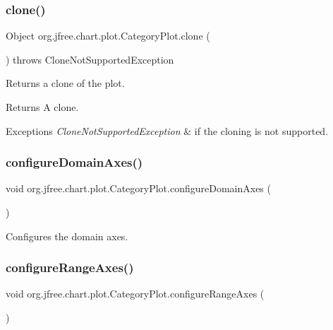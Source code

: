 \subsubsection{\texorpdfstring{clone()}{clone()}}
{\footnotesize\ttfamily Object org.\+jfree.\+chart.\+plot.\+Category\+Plot.\+clone (\begin{DoxyParamCaption}{ }\end{DoxyParamCaption}) throws Clone\+Not\+Supported\+Exception}

Returns a clone of the plot.

\begin{DoxyReturn}{Returns}
A clone.
\end{DoxyReturn}

\begin{DoxyExceptions}{Exceptions}
{\em Clone\+Not\+Supported\+Exception} & if the cloning is not supported. \\
\hline
\end{DoxyExceptions}
\mbox{\label{classorg_1_1jfree_1_1chart_1_1plot_1_1_category_plot_aecdb1a8c70518fdf1402ef3ebdcd1fe3}} 
\subsubsection{\texorpdfstring{configure\+Domain\+Axes()}{configureDomainAxes()}}
{\footnotesize\ttfamily void org.\+jfree.\+chart.\+plot.\+Category\+Plot.\+configure\+Domain\+Axes (\begin{DoxyParamCaption}{ }\end{DoxyParamCaption})}

Configures the domain axes. \mbox{\label{classorg_1_1jfree_1_1chart_1_1plot_1_1_category_plot_a7c64bdc8e24ac670616ae0f3d138ea29}} 
\subsubsection{\texorpdfstring{configure\+Range\+Axes()}{configureRangeAxes()}}
{\footnotesize\ttfamily void org.\+jfree.\+chart.\+plot.\+Category\+Plot.\+configure\+Range\+Axes (\begin{DoxyParamCaption}{ }\end{DoxyParamCaption})}


